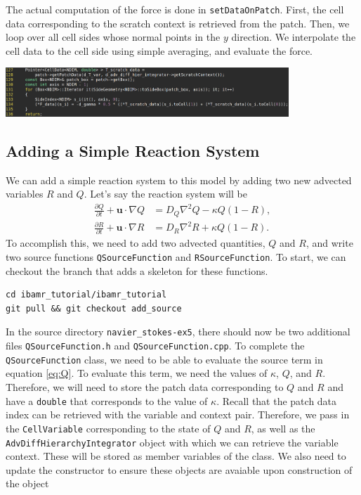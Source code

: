\documentclass{article}
\newcommand{\bu}{\mathbf{u}}
\newcommand{\grad}{\nabla}
\newcommand{\Lap}{\nabla^2}
\begin{document}
The actual computation of the force is done in \verb|setDataOnPatch|. First, the cell data corresponding to the scratch context is retrieved from the patch. Then, we loop over all cell sides whose normal points in the $y$ direction. We interpolate the cell data to the cell side using simple averaging, and evaluate the force.
\begin{center}
\includegraphics[width=0.8\textwidth]{Graphs/NS-ex5/Boussinesq_setDataOnPatch.png}
\end{center}

\subsection{Adding a Simple Reaction System}
We can add a simple reaction system to this model by adding two new advected variables $R$ and $Q$. Let's say the reaction system will be
\begin{align}
\frac{\partial Q}{\partial t} + \bu\cdot\grad Q &= D_Q \Lap Q - \kappa Q(1 - R), \label{eq:Q}\\
\frac{\partial R}{\partial t} + \bu\cdot\grad R &= D_R \Lap R + \kappa Q(1 - R). \label{eq:R}
\end{align}
To accomplish this, we need to add two advected quantities, $Q$ and $R$, and write two source functions \verb|QSourceFunction| and \verb|RSourceFunction|. To start, we can checkout the branch that adds a skeleton for these functions.
\begin{verbatim}
cd ibamr_tutorial/ibamr_tutorial
git pull && git checkout add_source
\end{verbatim}
In the source directory \verb|navier_stokes-ex5|, there should now be two additional files \verb|QSourceFunction.h| and \verb|QSourceFunction.cpp|. To complete the \verb|QSourceFunction| class, we need to be able to evaluate the source term in equation \eqref{eq:Q}. To evaluate this term, we need the values of $\kappa$, $Q$, and $R$. Therefore, we will need to store the patch data corresponding to $Q$ and $R$ and have a \verb|double| that corresponds to the value of $\kappa$. Recall that the patch data index can be retrieved with the variable and context pair. Therefore, we pass in the \verb|CellVariable| corresponding to the state of $Q$ and $R$, as well as the \verb|AdvDiffHierarchyIntegrator| object with which we can retrieve the variable context. These will be stored as member variables of the class. We also need to update the constructor to ensure these objects are avaiable upon construction of the object
\end{document}
